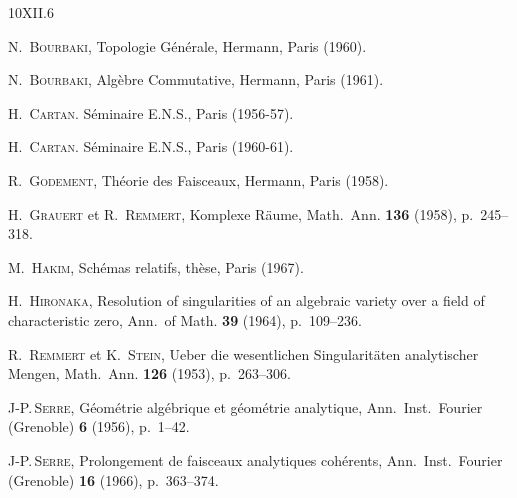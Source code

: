 \begin{thebibliography}{10}{XII.6}

 N.\, \textsc{Bourbaki},
Topologie G\'en\'erale, Hermann, Paris (1960).

 N.\, \textsc{Bourbaki},
Alg\`ebre Commutative, Hermann, Paris (1961).

 H.\, \textsc{Cartan}. S\'eminaire E.N.S., Paris (1956-57).

 H.\, \textsc{Cartan}. S\'eminaire E.N.S., Paris (1960-61).

 R.\, \textsc{Godement}, Th\'eorie des Faisceaux, Hermann, Paris
(1958).

 H.\, \textsc{Grauert} et R.\, \textsc{Remmert},
Komplexe R\"aume, Math.\ Ann. \textbf{136} (1958), p.\, 245--318.

 M.\, \textsc{Hakim}, Sch\'emas relatifs, th\`ese, Paris (1967).

 H.\, \textsc{Hironaka},
Resolution of singularities of an algebraic variety over a field of characteristic zero, Ann.\ of Math. \textbf{39} (1964), p.\, 109--236.


 R.\, \textsc{Remmert} et K.\, \textsc{Stein},
Ueber die wesentlichen Singularit\"aten analytischer Mengen,
Math.\ Ann. \textbf{126} (1953), p.\, 263--306.

J-P.\,\textsc{Serre},
G\'eom\'etrie alg\'ebrique et g\'eom\'etrie analytique, Ann.\ Inst.\ Fourier (Grenoble) \textbf{6} (1956), p.\, 1--42.

J-P.\,\textsc{Serre},
Prolongement de faisceaux analytiques
coh\'erents, Ann.\ Inst.\ Fourier (Grenoble) \textbf{16} (1966), p.\, 363--374.


\end{thebibliography}

